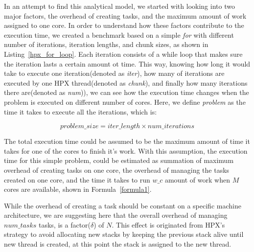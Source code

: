 In an attempt to find this analytical model, we started with looking into two major factors, the overhead of creating tasks, and the maximum amount of work assigned to one core. 
In order to understand how these factors contribute to the execution time, we created a benchmark based on a simple \textit{for} with different number of iterations, iteration lengths, and chunk sizes, as shown in Listing~\ref{hpx_for_loop}. 
Each iteration consists of a while loop that makes sure the iteration lasts a certain amount ot time. This way, knowing how long it would take to execute one iteration(denoted as \textit{iter}), how many of iterations are executed by one HPX thread(denoted as \textit{chunk}), and finally how many iterations there are(denoted as \textit{num})), we can see how the execution time changes when the problem is executed on different number of cores. Here, we define \textit{problem} as the time it takes to execute all the iterations, which is:

\begin{equation}\label{problem_size}
problem\_size = iter\_length\times{num\_iterations}
\end{equation}

The total execution time could be assumed to be the maximum amount of time it takes for one of the cores to finish it's work. With this assumption, the execution time for this simple problem, could be estimated as summation of maximum overhead of creating tasks on one core, the overhead of managing the tasks created on one core, and the time it takes to run $w\_c$ amount of work when $M$ cores are available, shown in Formula~\ref{formula1}. 

While the overhead of creating a task should be constant on a specific machine architecture, we are suggesting here that the overall overhead of managing $num\_{tasks}$ tasks, is a factor($\delta$) of $N$. This effect is originated from HPX's strategy to avoid allocating new stacks by keeping the previous stack alive until new thread is created, at this point the stack is assigned to the new thread. 



